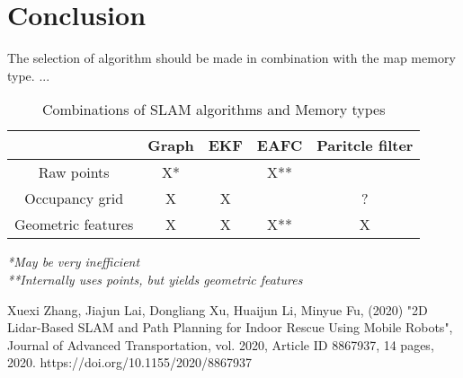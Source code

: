\documentclass[12pt, a4paper, onecolumn]{article}
\begin{document}
\section{Conclusion}

The selection of algorithm should be made in combination with the map memory type. ...

\begin{table}[h!]
  \begin{center}
    \begin{tabular}[c]{|c | c c c c |}
      \hline
                         & Graph & EKF & EAFC & Paritcle filter \\
      \hline
      Raw points         & X*    &     & X**  &  \\
      \hline
      Occupancy grid     & X     & X   &      & ? \\
      \hline
      Geometric features & X     & X   & X**  & X \\
      \hline
    \end{tabular}
  \end{center}
  \caption{Combinations of SLAM algorithms and Memory types}
  \label{tab:slam_memory_combinations}
\end{table}
\textit{*May be very inefficient} \\
\textit{**Internally uses points, but yields geometric features}

\newpage
\begin{thebibliography}{9}
Xuexi Zhang, Jiajun Lai, Dongliang Xu, Huaijun Li, Minyue Fu, (2020) "2D Lidar-Based SLAM and Path Planning for Indoor Rescue Using Mobile Robots", Journal of Advanced Transportation, vol. 2020, Article ID 8867937, 14 pages, 2020. https://doi.org/10.1155/2020/8867937

\end{thebibliography}
\end{document}
